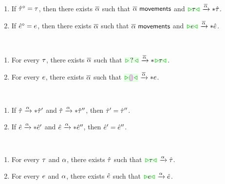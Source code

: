 \documentclass{article}
\begin{document}
\begin{lemma}[name=Reach Down] \
  \begin{enumerate}
    \item If $\hat{\tau}^{\diamond} = \tau$, then there exists $\overline{\alpha}$ such that $\overline{\alpha} ~{\normalfont{\normalfont\textsf{movements}}}$
      and $\ATActionIter{\ZTCursor{\TMV}}{\ZTMV}{\AIMV}$.

    \item If $\hat{e}^{\diamond} = e$, then there exists $\overline{\alpha}$ such that $\overline{\alpha} ~{\normalfont{\normalfont\textsf{movements}}}$
      and $\AEActionIter{\ZTCursor{\EMV}}{\ZMV}{\AIMV}$.
  \end{enumerate}
\end{lemma}

\begin{theorem}[name=Constructability] \
  \begin{enumerate}
    \item For every $\tau$, there exists $\overline{\alpha}$ such that
      $\ATActionIter{\ZTCursor{\TUnknown}}{\ZTCursor{\TMV}}{\AIMV}$.

    \item For every $e$, there exists $\overline{\alpha}$ such that
      $\AEActionIter{\ZCursor{\EEHole}}{\EMV}{\AIMV}$.
  \end{enumerate}
\end{theorem}

\begin{theorem}[name=Determinism] \
  \begin{enumerate}
    \item If $\hat{\tau} \xrightarrow{\alpha}* \hat{\tau}'$ and $\hat{\tau} \xrightarrow{\alpha}* \hat{\tau}''$, then
      $\hat{\tau}' = \hat{\tau}''$.

    \item If $\hat{e} \xrightarrow{\alpha}* \hat{e}'$ and $\hat{e} \xrightarrow{\alpha}* \hat{e}''$, then $\hat{e}'
      = \hat{e}''$.
  \end{enumerate}
\end{theorem}

\begin{theorem}[name=Actionability] \
  \begin{enumerate}
    \item For every $\tau$ and $\alpha$, there exists $\hat{\tau}$ such that
      $\ATAction{\ZTCursor{\TMV}}{\ZTMV}{\AMV}$.

    \item For every $e$ and $\alpha$, there exists $\hat{e}$ such that
      $\AEAction{\ZCursor{\EMV}}{\ZMV}{\AMV}$.
  \end{enumerate}
\end{theorem}
\end{document}

